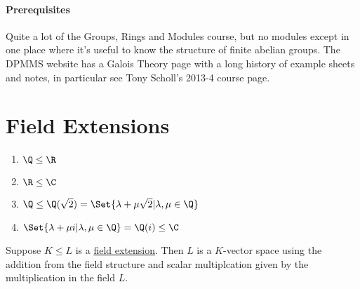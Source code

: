 \documentclass{article}
\begin{document}

\paragraph{Prerequisites} Quite a lot of the Groups, Rings and Modules course, but no modules except in one place where it's useful to know the structure of finite abelian groups.
The DPMMS website has a Galois Theory page with a long history of example sheets and notes, in particular see Tony Scholl's 2013-4 course page.
\clearpage

\section{Field Extensions}

\begin{eg}
    \leavevmode
    \begin{enumerate}[label=(\roman*)]
        \item $\Q \leq \R$
        \item $\R \leq \C$
        \item $\Q \leq \Q(\sqrt{2}) = \Set{\lambda + \mu \sqrt{2} | \lambda, \mu \in \Q}$
        \item $\Set{\lambda + \mu i | \lambda, \mu \in \Q} = \Q(i) \leq \C$
    \end{enumerate}
\end{eg}

Suppose $K \leq L$ is a \hyperlink{def:fieldExt}{field extension}. Then $L$ is a $K$-vector space using the addition from the field structure and scalar multiplcation given by the multiplication in the field $L$.

\end{document}
